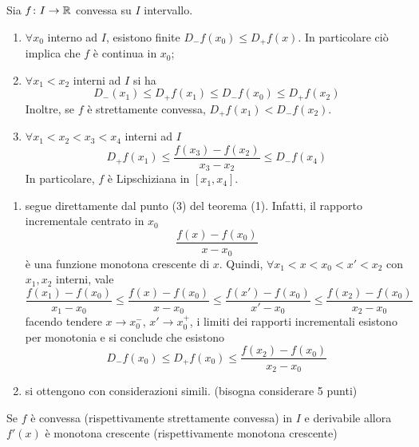 \documentclass[a4paper]{article}
\begin{document}
\begin{snippettheorem}{}
    Sia \(f\colon I \to \mathbb{R}\) convessa su \(I\) intervallo.
    \begin{enumerate}
        \item \(\forall x_0\) interno ad \(I\), esistono finite
        \(D_-f(x_0) \leq D_+f(x)\). In particolare ciò implica che \(f\) è continua in \(x_0\);
        \item \(\forall x_1 < x_2\) interni ad \(I\) si ha
        \[
            D_-(x_1) \leq D_+f(x_1) \leq D_-f(x_0) \leq D_+f(x_2)
        \]
        Inoltre, se \(f\) è strettamente convessa, \(D_+f(x_1) < D_-f(x_2)\).
        \item \(\forall x_1 < x_2 < x_3 < x_4\) interni ad \(I\)
        \[
            D_+f(x_1) \leq \frac{f(x_3) - f(x_2)}{x_3 - x_2} \leq D_-f(x_4)
        \]
        In particolare, \(f\) è Lipschiziana in \([x_1, x_4]\).
    \end{enumerate}
\end{snippettheorem}

\begin{snippetproof}{}
    \begin{enumerate}
        \item segue direttamente dal punto (3) del teorema (1).
        Infatti, il rapporto incrementale centrato in \(x_0\)
        \[
            \frac{f(x) - f(x_0)}{x-x_0}
        \]
        è una funzione monotona crescente di \(x\).
        Quindi, \(\forall x_1 < x < x_0 < x' < x_2\) con \(x_1, x_2\) interni,
        vale
        \[
            \frac{f(x_1) - f(x_0)}{x_1 - x_0} \leq \frac{f(x) - f(x_0)}{x-x_0}
            \leq \frac{f(x') - f(x_0)}{x'-x_0}
            \leq \frac{f(x_2) - f(x_0)}{x_2-x_0}
        \]
        facendo tendere \(x\to x_0^-\), \(x' \to x_0^+\), i limiti
        dei rapporti incrementali esistono per monotonia
        e si conclude che esistono \[
            D_-f(x_0) \leq D_+f(x_0) \leq \frac{f(x_2) - f(x_0)}{x_2 - x_0}
        \]
        \item[2.,3.] si ottengono con considerazioni simili. (bisogna considerare 5 punti)
    \end{enumerate}
\end{snippetproof}

\begin{snippetcorollary}{}
    Se \(f\) è convessa (rispettivamente strettamente convessa)
    in \(I\) e derivabile %
    allora \(f'(x)\) è monotona crescente (rispettivamente monotona crescente)
\end{snippetcorollary}
\end{document}
